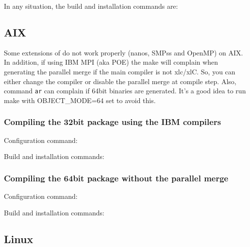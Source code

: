 In any situation, the build and installation commands are:


\subsection{AIX}

Some extensions of \TRACE do not work properly (nanos, SMPss and OpenMP) on AIX. In addition, if using IBM MPI (aka POE) the make will complain when generating the parallel merge if the main compiler is not xlc/xlC. So, you can either change the compiler or disable the parallel merge at compile step. Also, command {\tt ar} can complain if 64bit binaries are generated. It's a good idea to run make with OBJECT\_MODE=64 set to avoid this.

\subsubsection{Compiling the 32bit package using the IBM compilers}

Configuration command:


Build and installation commands:


\subsubsection{Compiling the 64bit package without the parallel merge}

Configuration command:


Build and installation commands:



\subsection{Linux}

